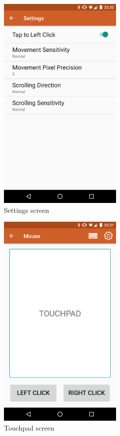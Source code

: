 \documentclass{sig-alternate}
\renewcommand\_{\textunderscore\allowbreak}  %
\begin{document}
\begin{figure}[hp]
	\hypertarget{fig:settings}{}
	\centering
	\includegraphics[width=6cm]{screenshots/settings}
	\caption{Settings screen}
\end{figure}

\begin{figure}[hp]
	\hypertarget{fig:touchpad}{}
	\centering
	\includegraphics[width=6cm]{screenshots/touchpad}
	\caption{Touchpad screen}
\end{figure}
\end{document}
